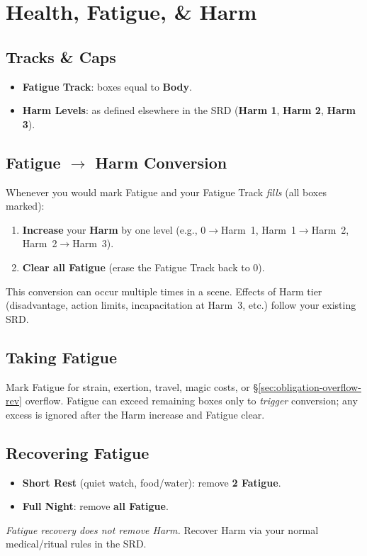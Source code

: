 \section{Health, Fatigue, \& Harm}
\label{sec:health-fatigue-harm-rev}

\subsection*{Tracks \& Caps}
\begin{itemize}
  \item \textbf{Fatigue Track}: boxes equal to \textbf{Body}.
  \item \textbf{Harm Levels}: as defined elsewhere in the SRD (\textbf{Harm 1}, \textbf{Harm 2}, \textbf{Harm 3}).
\end{itemize}

\subsection*{Fatigue $\rightarrow$ Harm Conversion}
Whenever you would mark Fatigue and your Fatigue Track \emph{fills} (all boxes marked):
\begin{enumerate}
  \item \textbf{Increase} your \textbf{Harm} by one level (e.g., 0$\rightarrow$Harm~1, Harm~1$\rightarrow$Harm~2, Harm~2$\rightarrow$Harm~3).
  \item \textbf{Clear all Fatigue} (erase the Fatigue Track back to 0).
\end{enumerate}
This conversion can occur multiple times in a scene. Effects of Harm tier (disadvantage, action limits, incapacitation at Harm~3, etc.) follow your existing SRD.

\subsection*{Taking Fatigue}
Mark Fatigue for strain, exertion, travel, magic costs, or \S\ref{sec:obligation-overflow-rev} overflow. Fatigue can exceed remaining boxes only to \emph{trigger} conversion; any excess is ignored after the Harm increase and Fatigue clear.

\subsection*{Recovering Fatigue}
\begin{itemize}
  \item \textbf{Short Rest} (quiet watch, food/water): remove \textbf{2 Fatigue}.
  \item \textbf{Full Night}: remove \textbf{all Fatigue}.
\end{itemize}
\emph{Fatigue recovery does not remove Harm.} Recover Harm via your normal medical/ritual rules in the SRD.

